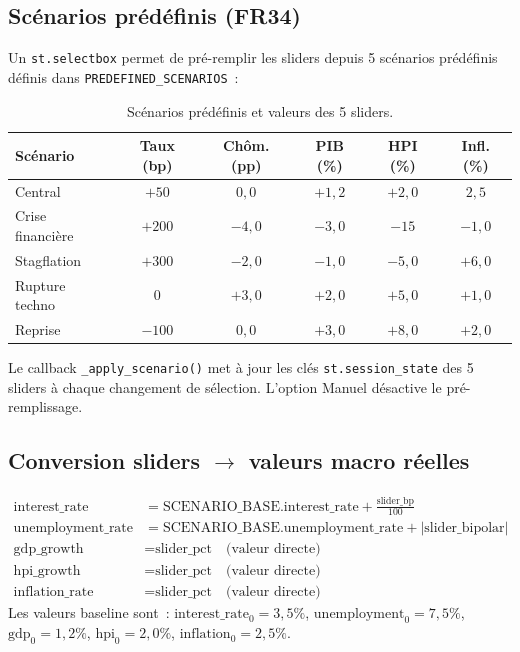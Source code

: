 \documentclass[12pt,a4paper]{article}
\begin{document}
\subsection{Sc\'enarios pr\'ed\'efinis (FR34)}

Un \texttt{st.selectbox} permet de pr\'e-remplir les sliders depuis 5 sc\'enarios pr\'ed\'efinis d\'efinis dans \texttt{PREDEFINED\_SCENARIOS}~:

\begin{table}[ht]
\centering
\caption{Sc\'enarios pr\'ed\'efinis et valeurs des 5 sliders.}
\label{tab:predefined}
\small
\begin{tabular}{@{}lccccc@{}}
\toprule
\textbf{Sc\'enario} & \textbf{Taux (bp)} & \textbf{Ch\^om. (pp)} & \textbf{PIB (\%)} & \textbf{HPI (\%)} & \textbf{Infl. (\%)} \\
\midrule
Central & $+50$ & $0{,}0$ & $+1{,}2$ & $+2{,}0$ & $2{,}5$ \\
Crise financi\`ere & $+200$ & $-4{,}0$ & $-3{,}0$ & $-15$ & $-1{,}0$ \\
Stagflation & $+300$ & $-2{,}0$ & $-1{,}0$ & $-5{,}0$ & $+6{,}0$ \\
Rupture techno & $0$ & $+3{,}0$ & $+2{,}0$ & $+5{,}0$ & $+1{,}0$ \\
Reprise & $-100$ & $0{,}0$ & $+3{,}0$ & $+8{,}0$ & $+2{,}0$ \\
\bottomrule
\end{tabular}
\end{table}

Le callback \texttt{\_apply\_scenario()} met \`a jour les cl\'es \texttt{st.session\_state} des 5 sliders \`a chaque changement de s\'election. L'option \og Manuel \fg{} d\'esactive le pr\'e-remplissage.

\subsection{Conversion sliders $\to$ valeurs macro r\'eelles}

\begin{formulebox}
\begin{align}
    \text{interest\_rate} &= \text{SCENARIO\_BASE.interest\_rate} + \frac{\text{slider\_bp}}{100} \\
    \text{unemployment\_rate} &= \text{SCENARIO\_BASE.unemployment\_rate} + |\text{slider\_bipolar}| \\
    \text{gdp\_growth} &= \text{slider\_pct} \quad \text{(valeur directe)} \\
    \text{hpi\_growth} &= \text{slider\_pct} \quad \text{(valeur directe)} \\
    \text{inflation\_rate} &= \text{slider\_pct} \quad \text{(valeur directe)}
\end{align}
Les valeurs baseline sont~: $\text{interest\_rate}_0 = 3{,}5\%$, $\text{unemployment}_0 = 7{,}5\%$, $\text{gdp}_0 = 1{,}2\%$, $\text{hpi}_0 = 2{,}0\%$, $\text{inflation}_0 = 2{,}5\%$.
\end{formulebox}
\end{document}
